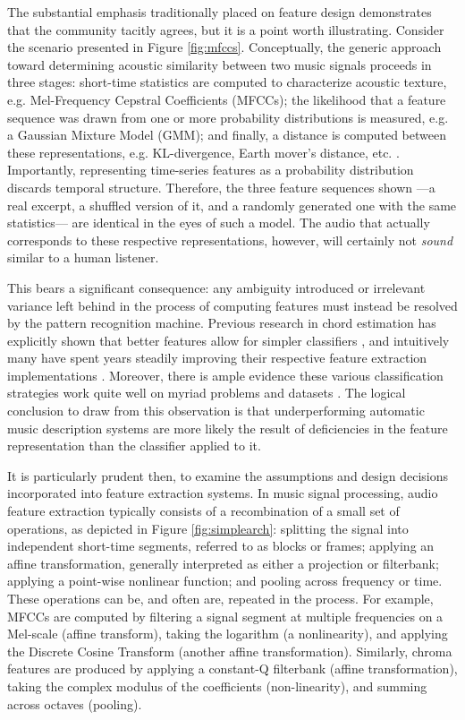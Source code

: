 The substantial emphasis traditionally placed on feature design demonstrates that the community tacitly agrees, but it is a point worth illustrating.
Consider the scenario presented in Figure \ref{fig:mfccs}.
Conceptually, the generic approach toward determining acoustic similarity between two music signals proceeds in three stages: short-time statistics are computed to characterize acoustic texture, e.g. Mel-Frequency Cepstral Coefficients (MFCCs); the likelihood that a feature sequence was drawn from one or more probability distributions is measured, e.g. a Gaussian Mixture Model (GMM); and finally, a distance is computed between these representations, e.g. KL-divergence, Earth mover's distance, etc. \cite{Berenzweig2004}.
Importantly, representing time-series features as a probability distribution discards temporal structure.
Therefore, the three feature sequences shown ---a real excerpt, a shuffled version of it, and a randomly generated one with the same statistics--- are identical in the eyes of such a model.
The audio that actually corresponds to these respective representations, however, will certainly not \emph{sound} similar to a human listener.

This bears a significant consequence: any ambiguity introduced or irrelevant variance left behind in the process of computing features must instead be resolved by the pattern recognition machine.
Previous research in chord estimation has explicitly shown that better features allow for simpler classifiers \cite{Cho2011}, and intuitively many have spent years steadily improving their respective feature extraction implementations \cite{Lyon2010,Mueller2011b}.
Moreover, there is ample evidence these various classification strategies work quite well on myriad problems and datasets \cite{Bishop2006}.
The logical conclusion to draw from this observation is that underperforming automatic music description systems are more likely the result of deficiencies in the feature representation than the classifier applied to it.

It is particularly prudent then, to examine the assumptions and design decisions incorporated into feature extraction systems.
In music signal processing, audio feature extraction typically consists of a recombination of a small set of operations, as depicted in Figure \ref{fig:simplearch}: splitting the signal into independent short-time segments, referred to as blocks or frames; applying an affine transformation, generally interpreted as either a projection or filterbank; applying a point-wise nonlinear function; and pooling across frequency or time.
These operations can be, and often are, repeated in the process.
For example, MFCCs are computed by filtering a signal segment at multiple frequencies on a Mel-scale (affine transform), taking the logarithm (a nonlinearity), and applying the Discrete Cosine Transform (another affine transformation).
Similarly, chroma features are produced by applying a constant-Q filterbank (affine transformation), taking the complex modulus of the coefficients (non-linearity), and summing across octaves (pooling).


